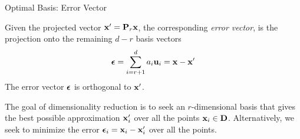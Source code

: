 \begin{frame}{Optimal Basis: Error Vector}

Given the projected vector $\mathbf{x}' = \mathbf{P}_r \mathbf{x}$, the corresponding
{\em error vector}, is the projection onto the remaining $d-r$ basis
vectors
\begin{align*}
    {\bm \epsilon} = \sum_{i=r+1}^d a_i \mathbf{u}_i = \mathbf{x} - \mathbf{x}'
\end{align*}
The error vector ${\bm \epsilon}$ is orthogonal to $\mathbf{x}'$.


\medskip
The goal of dimensionality reduction is to
seek an $r$-dimensional basis that gives the best
possible approximation $\mathbf{x}_i'$
over all the points $\mathbf{x}_i \in \mathbf{D}$.
Alternatively, we seek to minimize the error ${\bm \epsilon}_i =
\mathbf{x}_i - \mathbf{x}_i'$ over all the points.
\end{frame}




